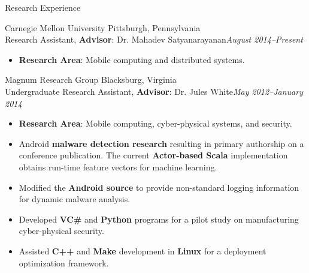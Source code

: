 \documentclass[letter]{article}
\begin{document}
\begin{minipage}{\textwidth}
{\huge Research Experience }


  
    {\large Carnegie Mellon University } \hfill Pittsburgh, Pennsylvania \\
    Research Assistant, {\bf Advisor}: Dr. Mahadev Satyanarayanan\hfill {\it August 2014--Present}\begin{itemize}
      
        \item {\bf Research Area}: Mobile computing and distributed systems.
      
      \end{itemize}\end{minipage}
    \begin{minipage}{\textwidth}
    \bigskip
  
    {\large Magnum Research Group } \hfill Blacksburg, Virginia \\
    Undergraduate Research Assistant, {\bf Advisor}: Dr. Jules White\hfill {\it May 2012--January 2014}\begin{itemize}
      
        \item {\bf Research Area}: Mobile computing, cyber-physical systems, and security.
      
        \item Android {\bf malware detection research} resulting in primary authorship on a conference publication. The current {\bf Actor-based Scala} implementation obtains run-time feature vectors for machine learning.
      
        \item Modified the {\bf Android source} to provide non-standard logging information for dynamic malware analysis.
      
        \item Developed {\bf VC\#} and {\bf Python} programs for a pilot study on manufacturing cyber-physical security.
      
        \item Assisted {\bf C++} and {\bf Make} development in {\bf Linux} for a deployment optimization framework.
      
      \end{itemize}\end{minipage}
\end{document}
